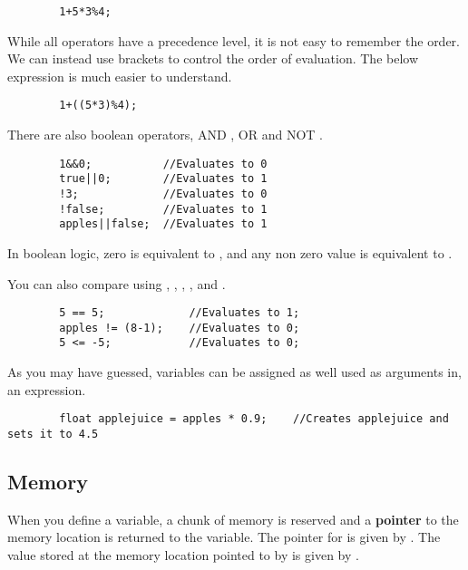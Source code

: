 \documentclass{article}
\begin{document}
		\begin{lstlisting}
		1+5*3%4;
		\end{lstlisting}

		While all operators have a precedence level, it is not easy to remember the order. We can instead use brackets to control the order of evaluation. The below expression is much easier to understand.

		\begin{lstlisting}
		1+((5*3)%4);
		\end{lstlisting}

		There are also boolean operators, AND \inlncd{\&\&}, OR \inlncd{||} and NOT \inlncd{!}.

		\begin{lstlisting}
		1&&0;			//Evaluates to 0
		true||0;		//Evaluates to 1
		!3;				//Evaluates to 0
		!false;			//Evaluates to 1
		apples||false;	//Evaluates to 1
		\end{lstlisting}

		In boolean logic, zero is equivalent to , and any non zero value is equivalent to .

		You can also compare using \inlncd{==}, \inlncd{!=}, \inlncd{>}, \inlncd{>=}, \inlncd{<} and \inlncd{<=}.

		\begin{lstlisting}
		5 == 5;				//Evaluates to 1;
		apples != (8-1);	//Evaluates to 0;
		5 <= -5;			//Evaluates to 0;
		\end{lstlisting}


		As you may have guessed, variables can be assigned as well used as arguments in, an expression.

		\begin{lstlisting}
		float applejuice = apples * 0.9;	//Creates applejuice and sets it to 4.5
		\end{lstlisting}

	\subsection{Memory}


		When you define a variable, a chunk of memory is reserved and a \textbf{pointer} to the memory location is returned to the variable. The pointer for  is given by . The value stored at the memory location pointed to by  is given by .
\end{document}
